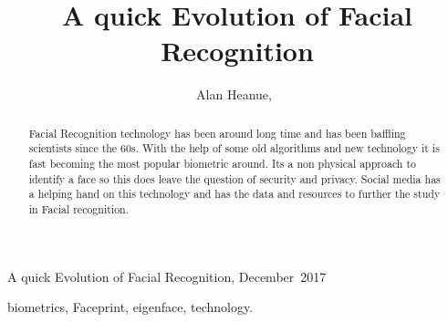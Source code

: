 \documentclass[journal]{IEEEtran}
\begin{document}
%
{A quick Evolution of Facial Recognition, December~2017}

\title{A quick Evolution of Facial Recognition}
\author{Alan Heanue,~%
}

\maketitle

\begin{abstract}
Facial Recognition technology has been around long time and has been baffling scientists since the 60s. With the help of some old algorithms and new technology it is fast becoming the most popular biometric around. Its a non physical approach to identify a face so this does leave the question of security and privacy. Social media has a helping hand on this technology and has the data and resources to further the study in Facial recognition.

\end{abstract}
\begin{IEEEkeywords}
biometrics, Faceprint, eigenface, technology.
\end{IEEEkeywords}
\end{document}
